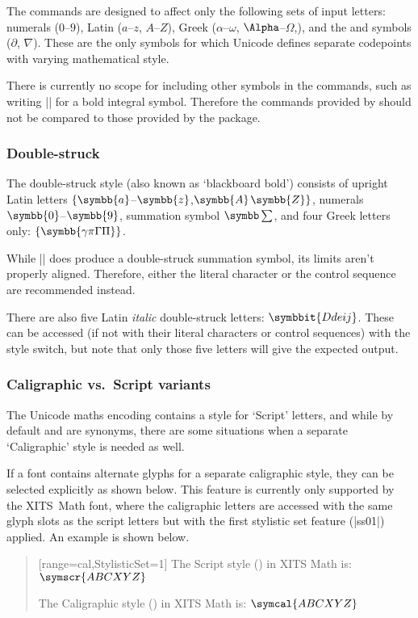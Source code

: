 The  commands are designed to affect only the following sets of input letters: numerals ($0$--$9$), Latin ($a$--$z$, $A$--$Z$), Greek ($\alpha$--$\omega$, $\Alpha$--$\Omega$,), and the  and  symbols ($\partial$, $\nabla$).
These are the only symbols for which Unicode defines separate codepoints with varying mathematical style.

There is currently no scope for including other symbols in the  commands, such as writing |\symbf{\int}| for a bold integral symbol.
Therefore the commands provided by  should not be compared to those provided by the  package.

\subsubsection{Double-struck}

The double-struck style (also known as `blackboard bold') consists of
upright Latin letters $\{\symbb{a}$--$\symbb{z}$,$\symbb{A}$$\symbb{Z}\}$,
numerals $\symbb{0}$--$\symbb{9}$, summation symbol $\symbb\sum$, and four
Greek letters only: $\{\symbb{\gamma\pi\Gamma\Pi}\}$.

While |\symbb{\sum}| does produce a double-struck summation symbol,
its limits aren't properly aligned. Therefore,
either the literal character or the control sequence  are
recommended instead.

There are also five Latin \emph{italic} double-struck letters: $\symbbit{Ddeij}$.
These can be accessed (if not with their literal characters or control sequences)
with the  style switch, but note that only those five letters
will give the expected output.

\subsubsection{Caligraphic vs.\ Script variants}

The Unicode maths encoding contains a style for `Script' letters,
and while by default  and 
are synonyms, there are some situations when a
separate `Caligraphic' style is needed as well.

If a font contains alternate glyphs for a separate caligraphic style,
they can be selected explicitly as shown below.
This feature is currently only supported by the XITS~Math font, where
the caligraphic letters are accessed with the same glyph slots as the
script letters but with the first stylistic set feature (|ss01|) applied.
An example is shown below.
\begin{quote}
[range=cal,StylisticSet=1]
The Script style () in XITS Math is: $\symscr{ABCXYZ}$\par
The Caligraphic style () in XITS Math is: $\symcal{ABCXYZ}$
\end{quote}


